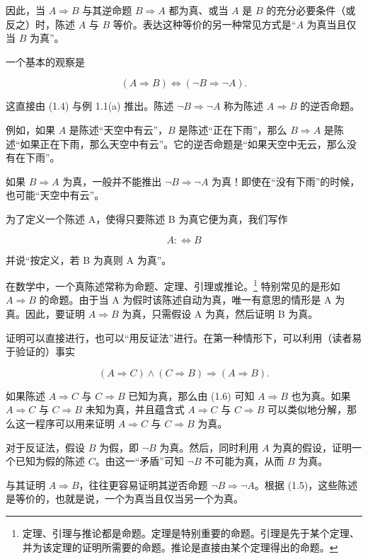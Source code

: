 \begin{remark}
因此，当 $A \Rightarrow B$ 与其逆命题 $B \Rightarrow A$ 都为真、或当 $A$ 是 $B$ 的充分必要条件（或反之）时，陈述 $A$ 与 $B$ 等价。表达这种等价的另一种常见方式是“$A$ 为真当且仅当 $B$ 为真”。

一个基本的观察是

\begin{equation}
(A\Rightarrow B)\Leftrightarrow(\lnot B\Rightarrow\lnot A).
\end{equation}

这直接由 (1.4) 与例 1.1(a) 推出。陈述 $ \neg B \Rightarrow \neg A $ 称为陈述 $ A \Rightarrow B $ 的逆否命题。

例如，如果 $A$ 是陈述“天空中有云”，$B$ 是陈述“正在下雨”，那么 $B \Rightarrow A$ 是陈述“如果正在下雨，那么天空中有云”。它的逆否命题是“如果天空中无云，那么没有在下雨”。

如果 $B \Rightarrow A$ 为真，一般并不能推出 $\neg B \Rightarrow \neg A$ 为真！即使在“没有下雨”的时候，也可能“天空中有云”。

为了定义一个陈述 A，使得只要陈述 B 为真它便为真，我们写作

\[
A:\Leftrightarrow B
\]

并说“按定义，若 B 为真则 A 为真”。

在数学中，一个真陈述常称为命题、定理、引理或推论。\footnote{定理、引理与推论都是命题。定理是特别重要的命题。引理是先于某个定理、并为该定理的证明所需要的命题。推论是直接由某个定理得出的命题。} 特别常见的是形如 $ A \Rightarrow B $ 的命题。由于当 A 为假时该陈述自动为真，唯一有意思的情形是 A 为真。因此，要证明 $ A \Rightarrow B $ 为真，只需假设 A 为真，然后证明 B 为真。

证明可以直接进行，也可以“用反证法”进行。在第一种情形下，可以利用（读者易于验证的）事实

\begin{equation}
(A\Rightarrow C)\land(C\Rightarrow B)\Rightarrow(A\Rightarrow B).
\end{equation}

如果陈述 $ A \Rightarrow C $ 与 $ C \Rightarrow B $ 已知为真，那么由 (1.6) 可知 $ A \Rightarrow B $ 也为真。如果 $ A \Rightarrow C $ 与 $ C \Rightarrow B $ 未知为真，并且蕴含式 $ A \Rightarrow C $ 与 $ C \Rightarrow B $ 可以类似地分解，那么这一程序可以用来证明 $ A \Rightarrow C $ 与 $ C \Rightarrow B $ 为真。

对于反证法，假设 $B$ 为假，即 $\neg B$ 为真。然后，同时利用 $A$ 为真的假设，证明一个已知为假的陈述 $C$。由这一“矛盾”可知 $\neg B$ 不可能为真，从而 $B$ 为真。

与其证明 $ A \Rightarrow B $，往往更容易证明其逆否命题 $ \neg B \Rightarrow \neg A $。根据 (1.5)，这些陈述是等价的，也就是说，一个为真当且仅当另一个为真。


\end{remark}
